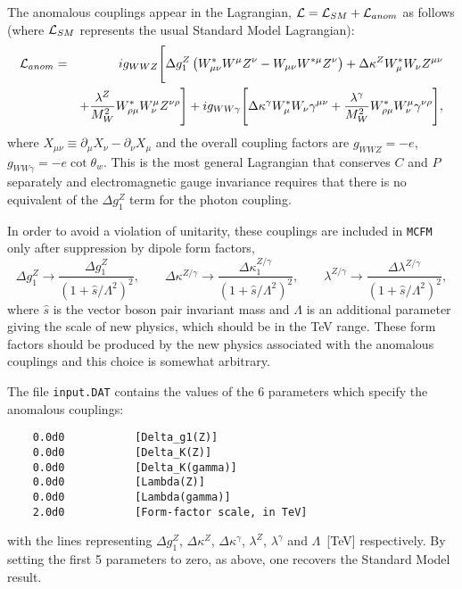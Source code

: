 \documentclass[12pt]{article}
\begin{document}
The anomalous couplings appear in the Lagrangian,
${\cal L} = {\cal L}_{SM} + {\cal L}_{anom}$ as follows
(where ${\cal L}_{SM}$ represents the usual Standard Model Lagrangian):
\begin{eqnarray}
{\cal L}_{anom} & = & i g_{WWZ} \Biggl[
 \Delta g_1^Z \left( W^*_{\mu\nu}W^\mu Z^\nu - W_{\mu\nu}W^{*\mu} Z^\nu \right)
+\Delta\kappa^Z W^*_\mu W_\nu Z^{\mu\nu} \nonumber \\
 & &+
 \frac{\lambda^Z}{M_W^2} W^*_{\rho\mu} W^\mu_\nu Z^{\nu\rho} \Biggr]
+i g_{WW\gamma} \Biggl[ 
 \Delta\kappa^\gamma W^*_\mu W_\nu \gamma^{\mu\nu}
+\frac{\lambda^\gamma}{M_W^2} W^*_{\rho\mu} W^\mu_\nu\gamma^{\nu\rho}
 \Biggr], \nonumber
\end{eqnarray}
where $X_{\mu\nu} \equiv \partial_\mu X_{\nu} - \partial_\nu X_{\mu}$
and the overall coupling factors are $g_{WWZ}=-e$,
$g_{WW\gamma}=-e\cot\theta_w$.
This is the most general Lagrangian that conserves $C$ and $P$
separately and electromagnetic gauge invariance requires that there
is no equivalent of the $\Delta g_1^Z$ term for the photon coupling.

In order to avoid a violation of unitarity, these couplings are included
in {\tt MCFM} only after suppression by dipole form factors,
\begin{displaymath}
\Delta g_1^Z \rightarrow \frac{\Delta g_1^Z}{(1+\hat{s}/\Lambda^2)^2}, \qquad
\Delta \kappa^{Z/\gamma} \rightarrow
 \frac{\Delta \kappa_1^{Z/\gamma}}{(1+\hat{s}/\Lambda^2)^2}, \qquad
\lambda^{Z/\gamma} \rightarrow
 \frac{\Delta \lambda^{Z/\gamma}}{(1+\hat{s}/\Lambda^2)^2},
\end{displaymath}
where $\hat{s}$ is the vector boson pair invariant mass and $\Lambda$
is an additional parameter giving the scale of new physics, which should
be in the TeV range.
These form factors should be produced by the new physics associated with the
anomalous couplings and this choice is somewhat arbitrary.

The file {\tt input.DAT} contains the values of the $6$ parameters
which specify the anomalous couplings:
\begin{verbatim}
    0.0d0           [Delta_g1(Z)]
    0.0d0           [Delta_K(Z)]
    0.0d0           [Delta_K(gamma)]
    0.0d0           [Lambda(Z)]
    0.0d0           [Lambda(gamma)]
    2.0d0           [Form-factor scale, in TeV]
\end{verbatim}
with the lines representing $\Delta g_1^Z$, $\Delta \kappa^Z$,
$\Delta \kappa^\gamma$, $\lambda^Z$, $\lambda^\gamma$ and
$\Lambda$~[TeV] respectively. By setting the first 5 parameters to zero,
as above, one recovers the Standard Model result.
\end{document}
